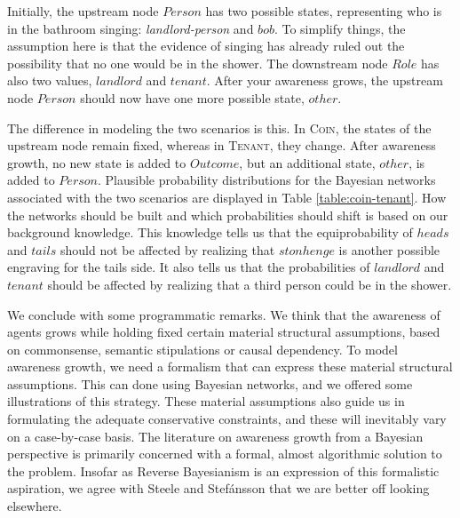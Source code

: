 \documentclass[
  11pt,
  dvipsnames,enabledeprecatedfontcommands]{scrartcl}
\begin{document}
\noindent Initially, the upstream node \(Person\) has two possible
states, representing who is in the bathroom singing:
\textit{landlord-person} and \(bob\). To simplify things, the assumption
here is that the evidence of singing has already ruled out the
possibility that no one would be in the shower. The downstream node
\(Role\) has also two values, \(landlord\) and \(tenant\). After your
awareness grows, the upstream node \(Person\) should now have one more
possible state, \(other\).

The difference in modeling the two scenarios is this. In \textsc{Coin},
the states of the upstream node remain fixed, whereas in
\textsc{Tenant}, they change. After awareness growth, no new state is
added to \(Outcome\), but an additional state, \(other\), is added to
\(Person\). Plausible probability distributions for the Bayesian
networks associated with the two scenarios are displayed in Table
\ref{table:coin-tenant}. How the networks should be built and which
probabilities should shift is based on our background knowledge. This
knowledge tells us that the equiprobability of \(heads\) and \(tails\)
should not be affected by realizing that \(stonhenge\) is another
possible engraving for the tails side. It also tells us that the
probabilities of \(landlord\) and \(tenant\) should be affected by
realizing that a third person could be in the shower.

We conclude with some programmatic remarks. We think that the awareness
of agents grows while holding fixed certain material structural
assumptions, based on commonsense, semantic stipulations or causal
dependency. To model awareness growth, we need a formalism that can
express these material structural assumptions. This can done using
Bayesian networks, and we offered some illustrations of this strategy.
These material assumptions also guide us in formulating the adequate
conservative constraints, and these will inevitably vary on a
case-by-case basis. The literature on awareness growth from a Bayesian
perspective is primarily concerned with a formal, almost algorithmic
solution to the problem. Insofar as Reverse Bayesianism is an expression
of this formalistic aspiration, we agree with Steele and Stefánsson that
we are better off looking elsewhere.
\end{document}
